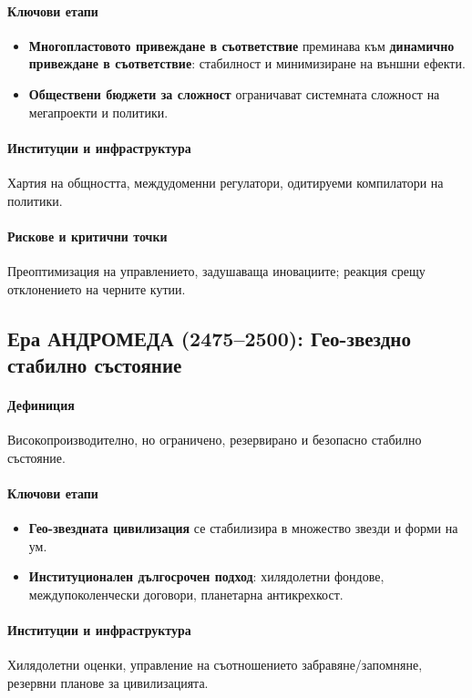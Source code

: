 \documentclass[11pt]{article}
\begin{document}
\paragraph{Ключови етапи}
\begin{itemize}[noitemsep]
  \item \textbf{Многопластовото привеждане в съответствие} преминава към \textbf{динамично привеждане в съответствие}: стабилност и минимизиране на външни ефекти.
  \item \textbf{Обществени бюджети за сложност} ограничават системната сложност на мегапроекти и политики.
\end{itemize}

\paragraph{Институции и инфраструктура} Хартия на общността, междудоменни регулатори, одитируеми компилатори на политики.

\paragraph{Рискове и критични точки} Преоптимизация на управлението, задушаваща иновациите; реакция срещу отклонението на черните кутии.

\subsection{Ера АНДРОМЕДА (2475–2500): Гео-звездно стабилно състояние}
\paragraph{Дефиниция} Високопроизводително, но ограничено, резервирано и безопасно стабилно състояние.

\paragraph{Ключови етапи}
\begin{itemize}[noitemsep]
  \item \textbf{Гео-звездната цивилизация} се стабилизира в множество звезди и форми на ум.
  \item \textbf{Институционален дългосрочен подход}: хилядолетни фондове, междупоколенчески договори, планетарна антикрехкост.
\end{itemize}

\paragraph{Институции и инфраструктура} Хилядолетни оценки, управление на съотношението забравяне/запомняне, резервни планове за цивилизацията.
\end{document}
